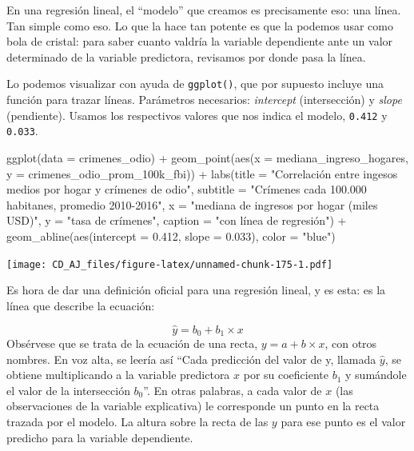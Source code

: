 \documentclass[
]{book}
\newenvironment{Shaded}{\begin{snugshade}}{\end{snugshade}}
\newcommand{\AttributeTok}[1]{\textcolor[rgb]{0.77,0.63,0.00}{#1}}
\newcommand{\FloatTok}[1]{\textcolor[rgb]{0.00,0.00,0.81}{#1}}
\newcommand{\FunctionTok}[1]{\textcolor[rgb]{0.00,0.00,0.00}{#1}}
\newcommand{\NormalTok}[1]{#1}
\newcommand{\SpecialCharTok}[1]{\textcolor[rgb]{0.00,0.00,0.00}{#1}}
\newcommand{\StringTok}[1]{\textcolor[rgb]{0.31,0.60,0.02}{#1}}
\begin{document}
En una regresión lineal, el ``modelo'' que creamos es precisamente eso: una línea. Tan simple como eso. Lo que la hace tan potente es que la podemos usar como bola de cristal: para saber cuanto valdría la variable dependiente ante un valor determinado de la variable predictora, revisamos por donde pasa la línea.

Lo podemos visualizar con ayuda de \texttt{ggplot()}, que por supuesto incluye una función para trazar líneas. Parámetros necesarios: \emph{intercept} (intersección) y \emph{slope} (pendiente). Usamos los respectivos valores que nos indica el modelo, \texttt{0.412} y \texttt{0.033}.

\begin{Shaded}
\begin{Highlighting}[]
\FunctionTok{ggplot}\NormalTok{(}\AttributeTok{data =}\NormalTok{ crimenes\_odio) }\SpecialCharTok{+} 
    \FunctionTok{geom\_point}\NormalTok{(}\FunctionTok{aes}\NormalTok{(}\AttributeTok{x =}\NormalTok{ mediana\_ingreso\_hogares, }\AttributeTok{y =}\NormalTok{ crimenes\_odio\_prom\_100k\_fbi)) }\SpecialCharTok{+}
    \FunctionTok{labs}\NormalTok{(}\AttributeTok{title =} \StringTok{"Correlación entre ingesos medios por hogar y crímenes de odio"}\NormalTok{,}
         \AttributeTok{subtitle =} \StringTok{"Crímenes cada 100.000 habitanes, promedio 2010{-}2016"}\NormalTok{,}
         \AttributeTok{x =} \StringTok{"mediana de ingresos por hogar (miles USD)"}\NormalTok{,}
         \AttributeTok{y =} \StringTok{"tasa de crímenes"}\NormalTok{,}
         \AttributeTok{caption =} \StringTok{"con línea de regresión"}\NormalTok{) }\SpecialCharTok{+}
    \FunctionTok{geom\_abline}\NormalTok{(}\FunctionTok{aes}\NormalTok{(}\AttributeTok{intercept =} \FloatTok{0.412}\NormalTok{, }\AttributeTok{slope =} \FloatTok{0.033}\NormalTok{), }\AttributeTok{color =} \StringTok{"blue"}\NormalTok{)}
\end{Highlighting}
\end{Shaded}

\texttt{[image: CD\_AJ\_files/figure-latex/unnamed-chunk-175-1.pdf]}

Es hora de dar una definición oficial para una regresión lineal, y es esta: es la línea que describe la ecuación:

\[ \hat{y} = b_0 + b_1 \times x \] Obsérvese que se trata de la ecuación de una recta, \(y = a + b \times x\), con otros nombres. En voz alta, se leería así ``Cada predicción del valor de y, llamada \(\hat{y}\), se obtiene multiplicando a la variable predictora \(x\) por su coeficiente \(b_1\) y sumándole el valor de la intersección \(b_0\)''. En otras palabras, a cada valor de \(x\) (las observaciones de la variable explicativa) le corresponde un punto en la recta trazada por el modelo. La altura sobre la recta de las \(y\) para ese punto es el valor predicho para la variable dependiente.
\end{document}
